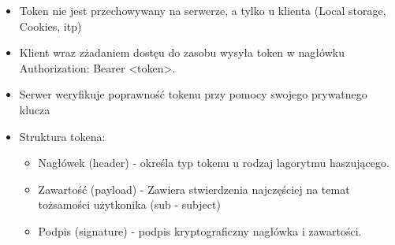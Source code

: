 \documentclass[../main.tex]{subfiles}
\begin{document}
\begin{enumerate}
\begin{itemize}
            \item Token nie jest przechowywany na serwerze, a tylko u klienta (Local storage, Cookies, itp)
            \item Klient wraz zżadaniem dostęu do zasobu wysyła token w nagłówku
            Authorization: Bearer <token>.
            \item Serwer weryfikuje poprawność tokenu przy pomocy swojego prywatnego klucza
            \item Struktura tokena:
            \begin{itemize}
                \item Nagłówek (header) - określa typ tokenu u rodzaj lagorytmu haszującego.
                \item Zawartość (payload) - Zawiera stwierdzenia najczęściej na temat
                tożsamości użytkonika (sub - subject)
                \item Podpis (signature) - podpis kryptograficzny nagłówka i zawartości.
            \end{itemize}
        \end{itemize}
    \end{enumerate}
\end{document}
